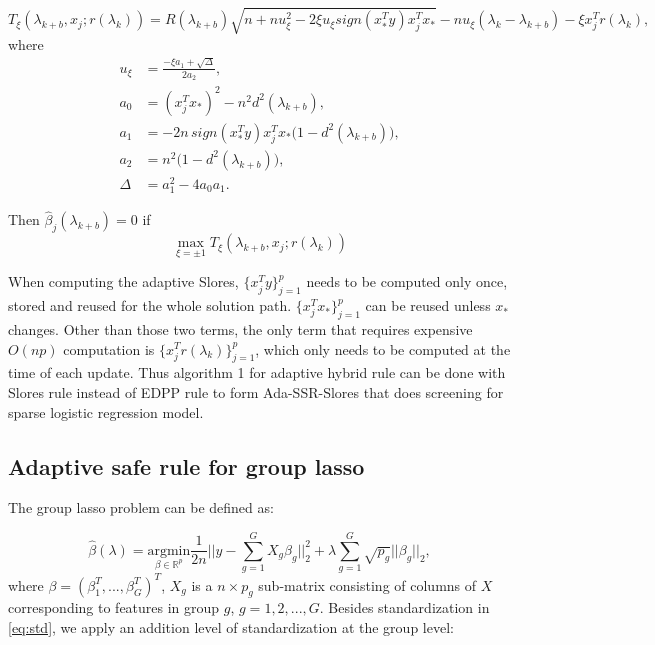 \begin{theorem}
\begin{enumerate}
    \begin{equation}
        T_\xi(\lambda_{k+b},x_j;r(\lambda_k))=R(\lambda_{k+b})\sqrt{n+nu_\xi^2-2\xi u_\xi sign(x_*^Ty)x_j^Tx_*}-nu_\xi(\lambda_k-\lambda_{k+b})-\xi x_j^Tr(\lambda_k),
    \end{equation}
    where
    \begin{align}
        u_\xi&=\frac{-\xi a_1+\sqrt{\Delta}}{2a_2},\\
        a_0&=(x_j^Tx_*)^2-n^2d^2(\lambda_{k+b}),\nonumber\\
        a_1&=-2n\,sign(x_*^Ty)x_j^Tx_*\big(1-d^2(\lambda_{k+b})\big),\nonumber\\
        a_2&=n^2\big(1-d^2(\lambda_{k+b})\big),\nonumber\\
        \Delta&=a_1^2-4a_0a_1.\nonumber
    \end{align}
\end{enumerate}

Then $\hat{\beta}_j(\lambda_{k+b})=0$ if
        \begin{equation}
            \max_{\xi=\pm1} T_\xi(\lambda_{k+b},x_j;r(\lambda_k))
        \end{equation}
\end{theorem}

When computing the adaptive Slores, $\{x_j^Ty\}_{j=1}^p$ needs to be computed only once, stored and reused for the whole solution path. $\{x_j^Tx_*\}_{j=1}^p$ can be reused unless $x_*$ changes. Other than those two terms, the only term that requires expensive $O(np)$ computation is $\{x_j^Tr(\lambda_k)\}_{j=1}^p$, which only needs to be computed at the time of each update. Thus algorithm 1 for adaptive hybrid rule can be done with Slores rule instead of EDPP rule to form Ada-SSR-Slores that does screening for sparse logistic regression model.

\subsection{Adaptive safe rule for group lasso}

The group lasso problem \citep{yuan2006model} can be defined as:

\begin{equation}
    \label{eq:glasso}
    \hat{\beta}(\lambda) = \underset{\beta\in \mathbb{R}^p}{\mathrm{argmin}}\frac{1}{2n}\bigg|\bigg|y-\sum_{g=1}^GX_g\beta_g\bigg|\bigg|_2^2+\lambda\sum_{g=1}^G\sqrt{p_g}||\beta_g||_2,
\end{equation}
where $\beta=(\beta_1^T,...,\beta_G^T)^T$, $X_g$ is a $n\times p_g$ sub-matrix consisting of columns of $X$ corresponding to features in group $g$, $g=1,2,...,G$. Besides standardization in \eqref{eq:std}, we apply an addition level of standardization at the group level\citep{breheny2015group}:

